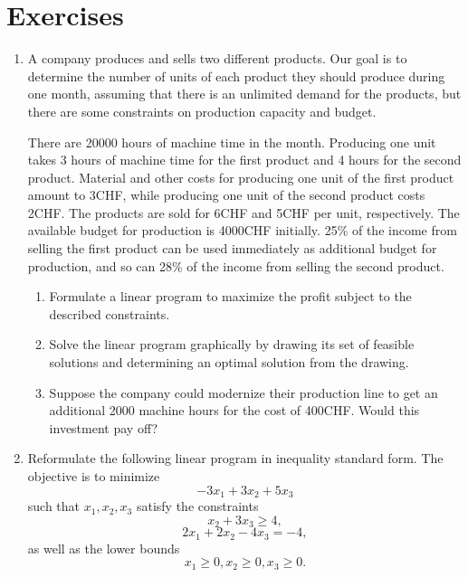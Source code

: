 \section*{Exercises}

\begin{enumerate}[1)]
\item A company produces and sells two different products.
Our goal is to determine the number of units of each product they should produce during one month,
assuming that there is an unlimited demand for the products,
but there are some constraints on production capacity and budget.

There are 20000 hours of machine time in the month.
Producing one unit takes 3 hours of machine time for the first product and 4 hours for the second product.
Material and other costs for producing one unit of the first product amount to 3CHF,
while producing one unit of the second product costs 2CHF.
The products are sold for 6CHF and 5CHF per unit, respectively.
The available budget for production is 4000CHF initially.
25\% of the income from selling the first product can be used immediately as additional budget for production,
and so can 28\% of the income from selling the second product.
\begin{enumerate}
\item Formulate a linear program to maximize the profit subject to the described constraints.
\item Solve the linear program graphically by drawing its set of feasible solutions and determining an optimal solution from the drawing.
\item Suppose the company could modernize their production line to get an additional 2000 machine hours for the cost of 400CHF.
  Would this investment pay off?
\end{enumerate}

\item Reformulate the following linear program in inequality standard form. 
The objective is to minimize
\begin{displaymath}
  -3 x_1 + 3 x_2 + 5 x_3 
\end{displaymath}
such that $x_1,x_2,x_3$ satisfy the constraints
\begin{equation}
  \label{eq:2}
  x_2+ 3 x_3 ≥ 4, 
\end{equation}
\begin{equation}
  \label{eq:3}
  2x_1 + 2  x_2 - 4 x_3  = -4, 
\end{equation}
as well as the lower bounds
\begin{equation}
  \label{eq:4}
  x_1≥0, x_2 ≥ 0, x_3 ≥ 0.
\end{equation}


\end{enumerate}
